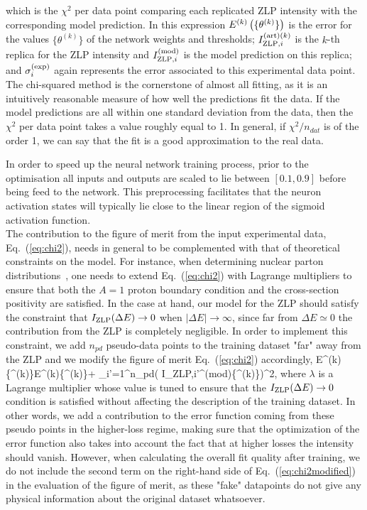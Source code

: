 which is the $\chi^2$ per data point comparing each replicated ZLP intensity
with the corresponding model prediction.
%
In this expression $E^{(k)}\left( \{\theta^{(k)}\}\right)$ is the error for the values 
$\{\theta^{(k)}\}$ of the network weights and thresholds;
$I_{{\rm ZLP},i}^{{\rm (art)}(k)}$ is the $k$-th replica for the ZLP 
intensity and $I_{{\rm ZLP},i}^{{\rm (mod)}}$ is the model prediction on this
replica; and ${\sigma_i^{(\rm exp)}}$ again represents the error
associated to this experimental data point.\\

The chi-squared method is the cornerstone of almost all fitting, 
as it is an intuitively reasonable measure of how well the predictions fit the data. 
%
If the model predictions are all within one standard deviation from the data, 
then the $\chi^2$ per data point takes a value roughly equal to 1. 
%
In general, if $\chi^2/n_{dat}$ is of the order 1, we can say that the 
fit is a good approximation to the real data. 

In order to speed up the neural network training process, prior to the optimisation
all inputs and outputs are scaled to lie between $[0.1, 0.9]$ before
being feed to the network.
%
This preprocessing facilitates that
the neuron activation states will typically
lie close to the linear region of the sigmoid activation function.\\

The contribution to the figure of merit from the input experimental data, Eq.~(\ref{eq:chi2}),
needs in general to be complemented with that of theoretical constraints on the model.
%
For instance, when determining nuclear parton distributions~\cite{AbdulKhalek:2020yuc}, one needs to
extend Eq.~(\ref{eq:chi2}) with Lagrange multipliers to ensure that both the $A=1$ proton boundary
condition and the cross-section positivity are satisfied.
%
In the case at hand, our model for the ZLP should satisfy the constraint that $I_{\rm ZLP}(\Delta E)\to 0$
when $|\Delta E| \to \infty$, since far from $\Delta E\simeq 0$ the contribution from the ZLP
is completely negligible.
%
In order to implement this constraint, we add $n_{pd}$ pseudo-data points to the training dataset 
"far" away from the ZLP and we modify
the figure of merit Eq.~(\ref{eq:chi2}) accordingly,
\be
\label{eq:chi2modified}
E^{(k)}\lp \{\theta^{(k)}\}\rp \to E^{(k)}\lp \{\theta^{(k)}\}\rp +
\lambda \sum_{i'=1}^{n_{pd}}\left(
  I_{{\rm ZLP},i'}^{{\rm (mod)}}\lp \{\theta^{(k)}\}\rp \right)^2, 
  \ee
  where $\lambda$ is a Lagrange multiplier whose value is tuned to ensure that the $I_{\rm ZLP}(\Delta E)\to 0$
  condition
  is satisfied without affecting the description of the training dataset.
  In other words, we add a contribution to the error function coming from these pseudo points in the
  higher-loss regime, making sure that the optimization of the error function also takes into account
  the fact that at higher losses the intensity should vanish.
  However, when calculating the overall fit quality after training, we do not include the second term
  on the right-hand side of Eq.~(\ref{eq:chi2modified}) in the evaluation of the figure of merit, 
  as these "fake" datapoints do not give any physical
  information about the original dataset whatsoever.

